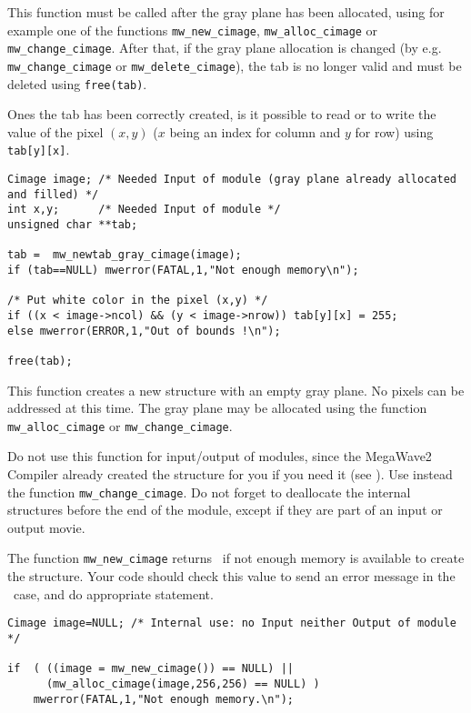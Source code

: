This function must be called after the gray plane has been allocated,
using for example one of the functions \verb+mw_new_cimage+, 
\verb+mw_alloc_cimage+ or \verb+mw_change_cimage+. 
After that, if the gray plane allocation is changed
(by e.g. \verb+mw_change_cimage+ or \verb+mw_delete_cimage+), the tab is
no longer valid and must be deleted using \verb+free(tab)+.

Ones the tab has been correctly created, is it possible to read or to
write the value of the pixel $(x,y)$ ($x$ being an index for column and $y$
for row) using \verb+tab[y][x]+.

\Next
\Example
\begin{verbatim}
Cimage image; /* Needed Input of module (gray plane already allocated and filled) */
int x,y;      /* Needed Input of module */
unsigned char **tab;

tab =  mw_newtab_gray_cimage(image);
if (tab==NULL) mwerror(FATAL,1,"Not enough memory\n");

/* Put white color in the pixel (x,y) */
if ((x < image->ncol) && (y < image->nrow)) tab[y][x] = 255;
else mwerror(ERROR,1,"Out of bounds !\n");

free(tab);

\end{verbatim}

\newpage %
\Description
This function creates a new \cimage structure with an empty gray plane.
No pixels can be addressed at this time.
The gray plane may be allocated using the function \verb+mw_alloc_cimage+ or
\verb+mw_change_cimage+.

Do not use this function for input/output of modules, since the MegaWave2
Compiler already created the structure for you if you need it (see \volI). Use instead the function \verb+mw_change_cimage+.
Do not forget to deallocate the internal structures before the end
of the module, except if they are part of an input or output movie.

The function \verb+mw_new_cimage+ returns \Null\ if not enough memory is available to create the structure. Your code should check this value to send an
error message in the \Null\ case, and do appropriate statement.

\Next
\Example
\begin{verbatim}
Cimage image=NULL; /* Internal use: no Input neither Output of module */

if  ( ((image = mw_new_cimage()) == NULL) ||
      (mw_alloc_cimage(image,256,256) == NULL) )
    mwerror(FATAL,1,"Not enough memory.\n");
\end{verbatim}

